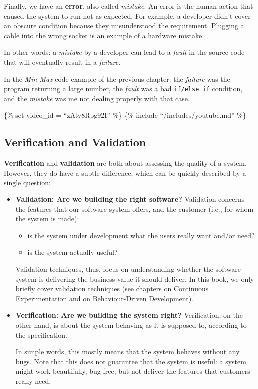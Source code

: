 Finally, we have an \textbf{error}, also called \emph{mistake}. An error
is the human action that caused the system to run not as expected. For
example, a developer didn't cover an obscure condition because they
misunderstood the requirement. Plugging a cable into the wrong socket is
an example of a hardware mistake.

In other words: a \emph{mistake} by a developer can lead to a
\emph{fault} in the source code that will eventually result in a
\emph{failure}.

In the \emph{Min-Max} code example of the previous chapter: the
\emph{failure} was the program returning a large number, the
\emph{fault} was a bad \texttt{if/else\ if} condition, and the
\emph{mistake} was me not dealing properly with that case.

\{\% set video\_id = ``zAty8Rpg92I'' \%\} \{\% include
``/includes/youtube.md'' \%\}

\hypertarget{verification-and-validation}{%
\subsection{Verification and
Validation}\label{verification-and-validation}}

\textbf{Verification} and \textbf{validation} are both about assessing
the quality of a system. However, they do have a subtle difference,
which can be quickly described by a single question:

\begin{itemize}
\item
  \textbf{Validation: Are we building the right software?} Validation
  concerns the features that our software system offers, and the
  customer (i.e., for whom the system is made):

  \begin{itemize}
  \tightlist
  \item
    is the system under development what the users really want and/or
    need?
  \item
    is the system actually useful?
  \end{itemize}

  Validation techniques, thus, focus on understanding whether the
  software system is delivering the business value it should deliver. In
  this book, we only briefly cover validation techniques (see chapters
  on Continuous Experimentation and on Behaviour-Driven Development).
\item
  \textbf{Verification: Are we building the system right?} Verification,
  on the other hand, is about the system behaving as it is supposed to,
  according to the specification.

  In simple words, this mostly means that the system behaves without any
  bugs. Note that this does not guarantee that the system is useful: a
  system might work beautifully, bug-free, but not deliver the features
  that customers really need.
\end{itemize}

